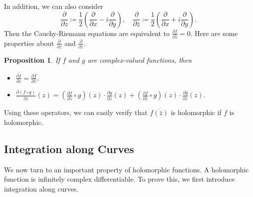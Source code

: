 \documentclass{article}
\newtheorem{proposition}[theorem]{Proposition}
\theoremstyle{definition}
\begin{document}
In addition, we can also consider 
\begin{equation*}
    \frac{\partial }{\partial z}\coloneq \frac{1}{2}\left(\frac{\partial }{\partial x} - i \frac{\partial }{\partial y}\right), \quad \frac{\partial }{\partial \bar{z}} \coloneq \frac{1}{2}\left(\frac{\partial }{\partial x} + i \frac{\partial }{\partial y}\right).
\end{equation*}
Then the Cauchy-Riemann equations are equivalent to \(\frac{\partial f}{\partial \bar{z}}=0\). Here are some properties about $\frac{\partial }{\partial z}$ and $\frac{\partial }{\partial \bar{z}}$.
\begin{proposition}
If \(f\) and \(g\) are complex-valued functions, then
\begin{itemize}
    \item $\overline{\frac{\partial f}{\partial z}}=\frac{\partial \bar{f}}{\partial \bar{z}}$.
    \item $\frac{\partial (f\circ g)}{\partial z}(z)
    =\left(\frac{\partial f}{\partial z}\circ g\right)(z)\cdot \frac{\partial g}{\partial z}(z)+\left(\frac{\partial f}{\partial \bar{z}}\circ g\right)(z)\cdot \frac{\partial \bar{g}}{\partial z}(z).$
\end{itemize}
\end{proposition}
Using these operators, we can easily verify that $\overline{f(\bar{z})}$ is holomorphic if \(f\) is holomorphic. 

\subsection{Integration along Curves}\label{integration along curves}
We now turn to an important property of holomorphic functions. A holomorphic function is infinitely complex differentiable. To prove this, we first introduce integration along curves.
\end{document}
